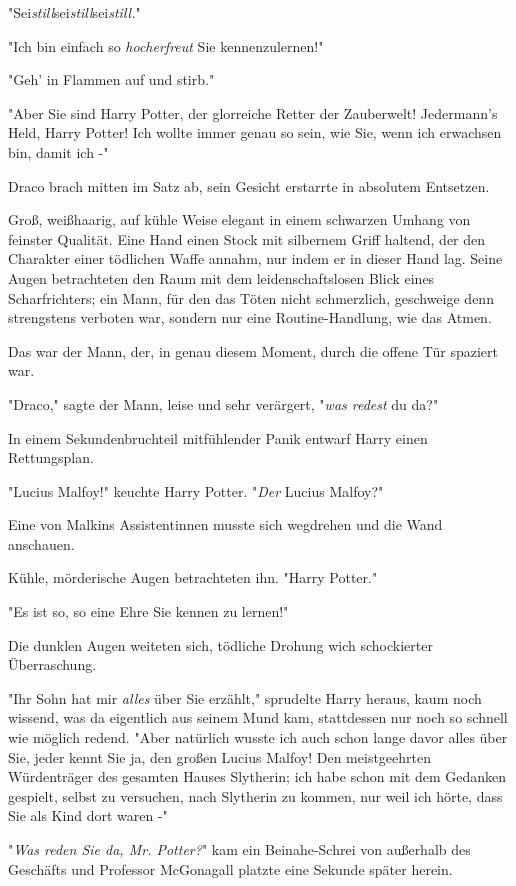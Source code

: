 {"Sei\emph{still}sei\emph{still}sei\emph{still.}"

"Ich bin einfach so \emph{hocherfreut} Sie kennenzulernen!"

"Geh' in Flammen auf und stirb."

"Aber Sie sind Harry Potter, der glorreiche Retter der Zauberwelt! Jedermann's Held, Harry Potter! Ich wollte immer genau so sein, wie Sie, wenn ich erwachsen bin, damit ich -"

Draco brach mitten im Satz ab, sein Gesicht erstarrte in absolutem Entsetzen.

Groß, weißhaarig, auf kühle Weise elegant in einem schwarzen Umhang von feinster Qualität. Eine Hand einen Stock mit silbernem Griff haltend, der den Charakter einer tödlichen Waffe annahm, nur indem er in dieser Hand lag. Seine Augen betrachteten den Raum mit dem leidenschaftslosen Blick eines Scharfrichters; ein Mann, für den das Töten nicht schmerzlich, geschweige denn strengstens verboten war, sondern nur eine Routine-Handlung, wie das Atmen.

Das war der Mann, der, in genau diesem Moment, durch die offene Tür spaziert war.

"Draco," sagte der Mann, leise und sehr verärgert, "\emph{was redest} du da?"

In einem Sekundenbruchteil mitfühlender Panik entwarf Harry einen Rettungsplan.

"Lucius Malfoy!" keuchte Harry Potter. "\emph{Der} Lucius Malfoy?"

Eine von Malkins Assistentinnen musste sich wegdrehen und die Wand anschauen.

Kühle, mörderische Augen betrachteten ihn. "Harry Potter."

"Es ist so, so eine Ehre Sie kennen zu lernen!"

Die dunklen Augen weiteten sich, tödliche Drohung wich schockierter Überraschung.

"Ihr Sohn hat mir \emph{alles} über Sie erzählt," sprudelte Harry heraus, kaum noch wissend, was da eigentlich aus seinem Mund kam, stattdessen nur noch so schnell wie möglich redend. "Aber natürlich wusste ich auch schon lange davor alles über Sie, jeder kennt Sie ja, den großen Lucius Malfoy! Den meistgeehrten Würdenträger des gesamten Hauses Slytherin; ich habe schon mit dem Gedanken gespielt, selbst zu versuchen, nach Slytherin zu kommen, nur weil ich hörte, dass Sie als Kind dort waren -"

"\emph{Was reden Sie da, Mr. Potter?}" kam ein Beinahe-Schrei von außerhalb des Geschäfts und Professor McGonagall platzte eine Sekunde später herein.

}

